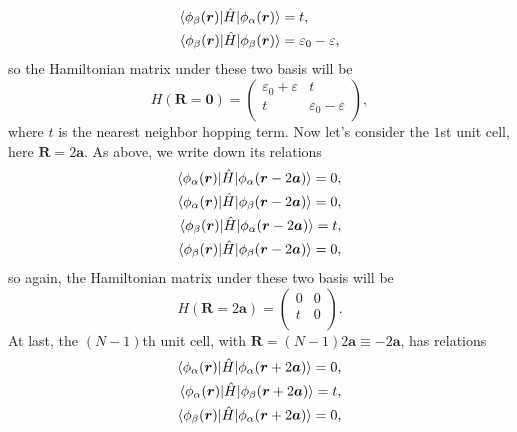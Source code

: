 \documentclass[12pt]{article}
\begin{document}
\begin{enumerate}[(a)]
\begin{align}
	      	\braket{\phi_\beta(\bm{r}) | \hat{H} | \phi_\alpha(\bm{r})}  & = t,                           \\
	      	\braket{\phi_\beta(\bm{r}) | \hat{H} | \phi_\beta(\bm{r})}   & = \varepsilon_0 - \varepsilon,
	      \end{align}
	      so the Hamiltonian matrix under these two basis will be
	      \begin{equation}
	      	H(\bm{R} = \bm{0}) =
	      	\begin{pmatrix}
	      		\varepsilon_0 + \varepsilon & t                           \\
	      		t                           & \varepsilon_0 - \varepsilon \\
	      	\end{pmatrix},
	      \end{equation}
	      where $t$ is the nearest neighbor hopping term. Now let's consider the $1$st unit cell, here $\bm{R} = 2\bm{a}$.
	      As above, we write down its relations
	      \begin{align}
	      	\braket{\phi_\alpha(\bm{r}) | \hat{H} | \phi_\alpha(\bm{r} - 2\bm{a})} = 0, \\
	      	\braket{\phi_\alpha(\bm{r}) | \hat{H} | \phi_\beta(\bm{r} - 2\bm{a})} = 0,  \\
	      	\braket{\phi_\beta(\bm{r}) | \hat{H} | \phi_\alpha(\bm{r} - 2\bm{a})} = t,  \\
	      	\braket{\phi_\beta(\bm{r}) | \hat{H} | \phi_\beta(\bm{r} - 2\bm{a})} = 0,
	      \end{align}
	      so again, the Hamiltonian matrix under these two basis will be
	      \begin{equation}
	      	H(\bm{R} = 2\bm{a}) =
	      	\begin{pmatrix}
	      		0 & 0 \\
	      		t & 0 \\
	      	\end{pmatrix}.
	      \end{equation}
	      At last, the $(N-1)$th unit cell, with $\bm{R} = (N-1) 2\bm{a} \equiv - 2\bm{a}$, has relations
	      \begin{align}
	      	\braket{\phi_\alpha(\bm{r}) | \hat{H} | \phi_\alpha(\bm{r} + 2\bm{a})} = 0, \\
	      	\braket{\phi_\alpha(\bm{r}) | \hat{H} | \phi_\beta(\bm{r} + 2\bm{a})} = t,  \\
	      	\braket{\phi_\beta(\bm{r}) | \hat{H} | \phi_\alpha(\bm{r} + 2\bm{a})} = 0,  \\

\end{align}
\end{enumerate}
\end{document}
